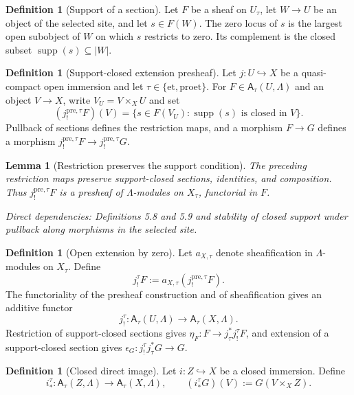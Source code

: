 \documentclass[10pt]{article}
\newtheorem{lemma}[theorem]{Lemma}
\theoremstyle{definition}
\newtheorem{definition}[theorem]{Definition}
\newcommand{\Lam}{\Lambda}
\newcommand{\et}{\mathrm{et}}
\newcommand{\proet}{\mathrm{proet}}
\newcommand{\dep}[1]{\par\smallskip\noindent\textit{Direct dependencies: #1}}
\begin{document}
\begin{definition}[Support of a section]
Let $F$ be a sheaf on $U_\tau$, let $W\to U$ be an object of the selected
site, and let $s\in F(W)$.  The zero locus of $s$ is the largest open
subobject of $W$ on which $s$ restricts to zero.  Its complement is the
closed subset $\operatorname{supp}(s)\subseteq |W|$.
\end{definition}

\begin{definition}[Support-closed extension presheaf]
Let $j:U\hookrightarrow X$ be a quasi-compact open immersion and let
$\tau\in\{\et,\proet\}$.  For $F\in\mathsf A_\tau(U,\Lam)$ and an object
$V\to X$, write $V_U=V\times_XU$ and set
\[
 (j^{\mathrm{pre},\tau}_!F)(V)
 =\{s\in F(V_U):\operatorname{supp}(s)\text{ is closed in }V\}.
\]
Pullback of sections defines the restriction maps, and a morphism $F\to G$
defines a morphism
$j^{\mathrm{pre},\tau}_!F\to j^{\mathrm{pre},\tau}_!G$.
\end{definition}

\begin{lemma}[Restriction preserves the support condition]
The preceding restriction maps preserve support-closed sections, identities,
and composition.  Thus $j^{\mathrm{pre},\tau}_!F$ is a presheaf of
$\Lam$-modules on $X_\tau$, functorial in $F$.
\dep{Definitions 5.8 and 5.9 and stability of closed support under pullback
along morphisms in the selected site.}
\end{lemma}

\begin{definition}[Open extension by zero]
Let $a_{X,\tau}$ denote sheafification in $\Lam$-modules on $X_\tau$.  Define
\[
 j_!^\tau F:=a_{X,\tau}(j^{\mathrm{pre},\tau}_!F).
\]
The functoriality of the presheaf construction and of sheafification gives an
additive functor
\[
j_!^\tau:\mathsf A_\tau(U,\Lam)\longrightarrow
\mathsf A_\tau(X,\Lam).
\]
Restriction of support-closed sections gives
$\eta_F:F\to j_\tau^*j_!^\tau F$, and extension of a support-closed section
gives $\epsilon_G:j_!^\tau j_\tau^*G\to G$.
\end{definition}

\begin{definition}[Closed direct image]
Let $i:Z\hookrightarrow X$ be a closed immersion.  Define
\[
i_*^\tau:\mathsf A_\tau(Z,\Lam)\longrightarrow
\mathsf A_\tau(X,\Lam),
\qquad
(i_*^\tau G)(V):=G(V\times_XZ).
\]
\end{definition}
\end{document}
